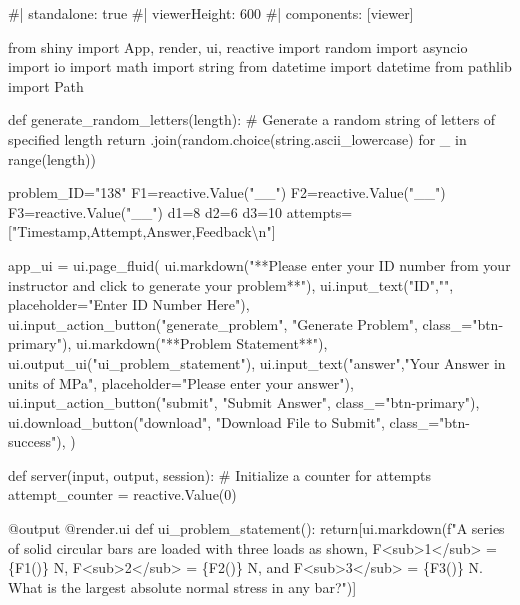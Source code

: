 \documentclass[
  letterpaper,
  DIV=11,
  numbers=noendperiod]{scrreprt}
\newenvironment{Shaded}{\begin{snugshade}}{\end{snugshade}}
\newcommand{\NormalTok}[1]{\textcolor[rgb]{0.00,0.23,0.31}{#1}}
\begin{document}
\begin{Shaded}
\begin{Highlighting}[]
\NormalTok{\#| standalone: true}
\NormalTok{\#| viewerHeight: 600}
\NormalTok{\#| components: [viewer]}

\NormalTok{from shiny import App, render, ui, reactive}
\NormalTok{import random}
\NormalTok{import asyncio}
\NormalTok{import io}
\NormalTok{import math}
\NormalTok{import string}
\NormalTok{from datetime import datetime}
\NormalTok{from pathlib import Path}


\NormalTok{def generate\_random\_letters(length):}
\NormalTok{    \# Generate a random string of letters of specified length}
\NormalTok{    return \textquotesingle{}\textquotesingle{}.join(random.choice(string.ascii\_lowercase) for \_ in range(length))  }

\NormalTok{problem\_ID="138"}
\NormalTok{F1=reactive.Value("\_\_")}
\NormalTok{F2=reactive.Value("\_\_")}
\NormalTok{F3=reactive.Value("\_\_")}
\NormalTok{d1=8}
\NormalTok{d2=6}
\NormalTok{d3=10}
\NormalTok{attempts=["Timestamp,Attempt,Answer,Feedback\textbackslash{}n"]}

\NormalTok{app\_ui = ui.page\_fluid(}
\NormalTok{    ui.markdown("**Please enter your ID number from your instructor and click to generate your problem**"),}
\NormalTok{    ui.input\_text("ID","", placeholder="Enter ID Number Here"),}
\NormalTok{    ui.input\_action\_button("generate\_problem", "Generate Problem", class\_="btn{-}primary"),}
\NormalTok{    ui.markdown("**Problem Statement**"),}
\NormalTok{    ui.output\_ui("ui\_problem\_statement"),}
\NormalTok{    ui.input\_text("answer","Your Answer in units of MPa", placeholder="Please enter your answer"),}
\NormalTok{    ui.input\_action\_button("submit", "Submit Answer", class\_="btn{-}primary"),}
\NormalTok{    ui.download\_button("download", "Download File to Submit", class\_="btn{-}success"),}
\NormalTok{)}


\NormalTok{def server(input, output, session):}
\NormalTok{    \# Initialize a counter for attempts}
\NormalTok{    attempt\_counter = reactive.Value(0)}
    
\NormalTok{    @output}
\NormalTok{    @render.ui}
\NormalTok{    def ui\_problem\_statement():}
\NormalTok{        return[ui.markdown(f"A series of solid circular bars are loaded with three loads as shown, F\textless{}sub\textgreater{}1\textless{}/sub\textgreater{} = \{F1()\} N, F\textless{}sub\textgreater{}2\textless{}/sub\textgreater{} = \{F2()\} N, and F\textless{}sub\textgreater{}3\textless{}/sub\textgreater{} = \{F3()\} N. What is the largest absolute normal stress in any bar?")]}
     

\end{Highlighting}
\end{Shaded}
\end{document}
